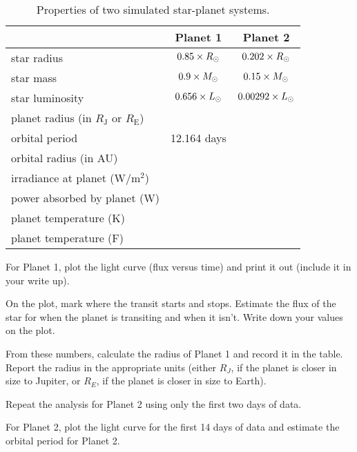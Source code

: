 \begin{table}
	\centering
	\begin{tabular}{l|c|c}
		\toprule
		& Planet 1 & Planet 2 \\
		\midrule
		star radius & $0.85 \times R_\textrm{\astrosun}$ & $0.202 \times R_\textrm{\astrosun}$  \\
		\midrule
		star mass & $0.9 \times M_\textrm{\astrosun}$ & $0.15 \times M_\textrm{\astrosun}$ \\
		\midrule
		star luminosity & $0.656 \times L_\textrm{\astrosun}$ & $0.00292 \times L_\textrm{\astrosun}$ \\
		\midrule
		planet radius (in $R_\textrm{J}$ or $R_\textrm{E}$) & & \\
		orbital period & 12.164 days & \\
		\midrule
		orbital radius (in AU) & & \\
		\midrule
		irradiance at planet (W$/$m$^2$) & & \\
		\midrule
		power absorbed by planet (W) & & \\
		\midrule
		planet temperature (K) & & \\
		\midrule
		planet temperature (\textdegree F) & & \\
		\bottomrule
	\end{tabular}
	\caption{Properties of two simulated star-planet systems.}\label{tr:tab:properties}
\end{table}

\begin{steps}
	\item For Planet 1, plot the light curve (flux versus time) and print it out
(include it in your write up).

	\item On the plot, mark where the transit starts
and stops. Estimate the flux of the star for when the planet is transiting
and when it isn’t. Write down your values on the plot.

	\item From these
numbers, calculate the radius of Planet 1 and record it in the table.
Report the radius in the appropriate units (either $R_J$, if the planet is
closer in size to Jupiter, or $R_E$, if the planet is closer in size to Earth).

	\item Repeat the analysis for Planet 2 using only the first two days of data.

	\item For Planet 2, plot the light curve for the first 14 days of data and
estimate the orbital period for Planet 2.
\end{steps}

